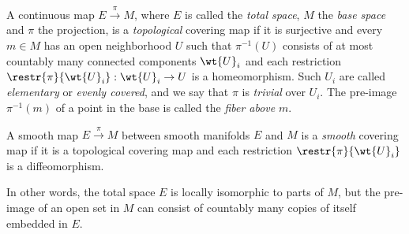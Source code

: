 \begin{defn}
A continuous map $E\overset{\pi}{\to} M$, where $E$ is called the \emph{total space}, $M$ the \emph{base space} and $\pi$ the projection, is a \emph{topological} covering map if it is surjective and every $m\in M$ has an open neighborhood $U$ such that $\pi^{-1}(U)$ consists of at most countably many connected components $\wt{U}_i$ and each restriction $\restr{\pi}{\wt{U}_i}:\wt{U}_i\to U$ is a homeomorphism. Such $U_i$ are called \emph{elementary} or \emph{evenly covered}, and we say that $\pi$ is \emph{trivial} over $U_i$. The pre-image $\pi^{-1}(m)$ of a point in the base is called the \emph{fiber above} $m$.
\end{defn}

\begin{defn}
A smooth map $E\overset{\pi}{\to} M$ between smooth manifolds $E$ and $M$ is a \emph{smooth} covering map if it is a topological covering map and each restriction $\restr{\pi}{\wt{U}_i}$ is a diffeomorphism.
\end{defn}

In other words, the total space $E$ is locally isomorphic to parts of $M$, but the pre-image of an open set in $M$ can consist of countably many copies of itself embedded in $E$.

